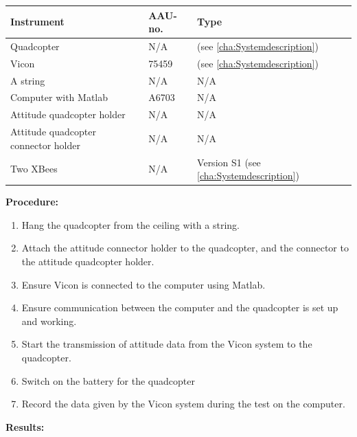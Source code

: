 \begin{table}[H]
	\begin{tabular}{|l|l|p{4.3cm}|}
		\hline%
		\textbf{Instrument}   &  \textbf{AAU-no.}  &  \textbf{Type}                       \\
		\hline%
		Quadcopter    	&  N/A 						&  (see \autoref{cha:Systemdescription}) 		      	 \\
		\hline%
	    Vicon 			& 75459                 &  (see \autoref{cha:Systemdescription})                  \\
		\hline%
		A string            &  N/A               & N/A     \\
		\hline%
		Computer with Matlab       &  A6703		 & N/A     \\
		\hline%
		Attitude quadcopter holder      &  N/A		 & N/A     \\
		\hline%
		Attitude quadcopter connector holder   &  N/A		 & N/A     \\
		\hline%
		Two XBees      &  N/A		 & Version S1 (see \autoref{cha:Systemdescription})   \\
		\hline%

	\end{tabular}
\end{table}
	
\textbf{Procedure:}

\begin{enumerate}
	\item Hang the quadcopter from the ceiling with a string.
	\item Attach the attitude connector holder to the quadcopter, and the connector to the attitude quadcopter holder.
	\item Ensure Vicon is connected to the computer using Matlab.
	\item Ensure communication between the computer and the quadcopter is set up and working.
	\item Start the transmission of attitude data from the Vicon system to the quadcopter.
	\item Switch on the battery for the quadcopter
	\item Record the data given by the Vicon system during the test on the computer.
\end{enumerate} 
\textbf{Results:}

